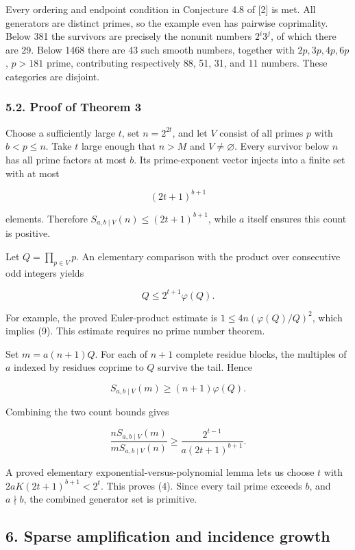\documentclass[
  11pt,
]{article}
\begin{document}
Every ordering and endpoint condition in Conjecture 4.8 of {[}2{]} is
met. All generators are distinct primes, so the example even has
pairwise coprimality. Below 381 the survivors are precisely the nonunit
numbers \(2^i3^j\), of which there are 29. Below 1468 there are 43 such
smooth numbers, together with \(2p,3p,4p,6p\), \(p>181\) prime,
contributing respectively 88, 51, 31, and 11 numbers. These categories
are disjoint.

\hypertarget{proof-of-theorem-3}{%
\subsubsection{5.2. Proof of Theorem 3}\label{proof-of-theorem-3}}

Choose a sufficiently large \(t\), set \(n=2^{2t}\), and let \(V\)
consist of all primes \(p\) with \(b<p\le n\). Take \(t\) large enough
that \(n>M\) and \(V\ne\varnothing\). Every survivor below \(n\) has all
prime factors at most \(b\). Its prime-exponent vector injects into a
finite set with at most

\[
(2t+1)^{b+1}
\]

elements. Therefore \(S_{a,b\mid V}(n)\le(2t+1)^{b+1}\), while \(a\)
itself ensures this count is positive.

Let \(Q=\prod_{p\in V}p\). An elementary comparison with the product
over consecutive odd integers yields

\[
Q\le2^{t+1}\varphi(Q). \tag{9}
\]

For example, the proved Euler-product estimate is
\(1\le4n(\varphi(Q)/Q)^2\), which implies (9). This estimate requires no
prime number theorem.

Set \(m=a(n+1)Q\). For each of \(n+1\) complete residue blocks, the
multiples of \(a\) indexed by residues coprime to \(Q\) survive the
tail. Hence

\[
S_{a,b\mid V}(m)\ge(n+1)\varphi(Q).
\]

Combining the two count bounds gives

\[
\frac{nS_{a,b\mid V}(m)}{mS_{a,b\mid V}(n)}
\ge\frac{2^{t-1}}{a(2t+1)^{b+1}}.
\]

A proved elementary exponential-versus-polynomial lemma lets us choose
\(t\) with \(2aK(2t+1)^{b+1}<2^t\). This proves (4). Since every tail
prime exceeds \(b\), and \(a\nmid b\), the combined generator set is
primitive.

\hypertarget{sparse-amplification-and-incidence-growth}{%
\subsection{6. Sparse amplification and incidence
growth}\label{sparse-amplification-and-incidence-growth}}
\end{document}
